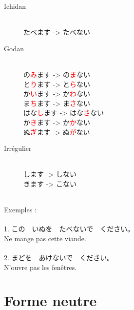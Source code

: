 \documentclass[11pt]{report}
\newenvironment{Japanese}{%
\CJKfamily{min}%
\CJKtilde  
\CJKnospace}{}
\begin{document}
\begin{CJK}{UTF8}{}  
\begin{Japanese}
	\begin{description}
		\item[Ichidan] \hfill \\
			たべます -> たべない
		\item[Godan] \hfill \\
			の\textcolor{red}{み}ます -> の\textcolor{red}{ま}ない \\
			と\textcolor{red}{り}ます -> と\textcolor{red}{ら}ない \\
			か\textcolor{red}{い}ます -> か\textcolor{red}{わ}ない \\
			ま\textcolor{red}{ち}ます -> ま\textcolor{red}{さ}ない \\
			はな\textcolor{red}{し}ます -> はな\textcolor{red}{さ}ない \\
			か\textcolor{red}{き}ます -> か\textcolor{red}{か}ない \\
			ぬ\textcolor{red}{ぎ}ます -> ぬ\textcolor{red}{が}ない
		\item[Irrégulier] \hfill \\
			します -> しない \\
			きます -> こない
	\end{description}
	\hfill \\
	Exemples : \\ \\
	1. この　いぬを　たべないで　ください。 \\
	Ne mange pas cette viande. \\ \\
	2. まどを　あけないで　ください。\\
	N'ouvre pas les fenêtres.
\end{Japanese}  
\end{CJK}

\section{Forme neutre}
\end{document}
